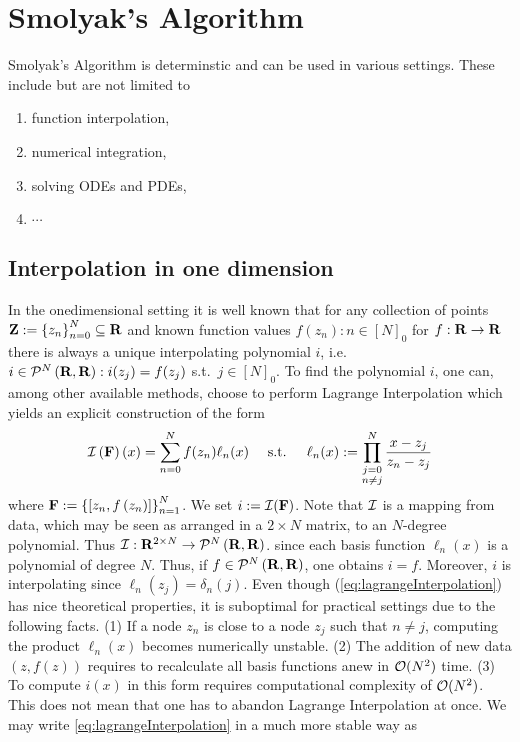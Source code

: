 \documentclass[12pt, oneside]{amsart}
\theoremstyle{definition}
\theoremstyle{remark}
\numberwithin{equation}{section}
\begin{document}
\section{Smolyak's Algorithm}


Smolyak's Algorithm is determinstic and can be used in various settings. These include but are not limited to
\begin{enumerate}
    \item function interpolation,
    \item numerical integration,
    \item solving ODEs and PDEs,
    \item \(\cdots\)
\end{enumerate}
\subsection*{Interpolation in one dimension}
In the onedimensional setting it is well known that for any collection of points \(\ZZ \defn \set{z_n}_{n=0}^N \subseteq \R\) and known function values \(f(z_n): n \in {[N]}_0\) for \(f: \R \to \R\) there is always a unique interpolating polynomial \(i\), i.e. \(i \in \pols[N]{\R, \R}: i(z_j) = f(z_j)\) s.t.\ \(j \in {[N]}_0\). To find the polynomial \(i\), one can, among other available methods, choose to perform Lagrange Interpolation which yields an explicit construction of the form
\begin{equation}\label{eq:lagrangeInterpolation}
    \mathcal{I}\left(\FF\right)(x) = \sum_{n=0}^N f(z_n) \ell_n(x)\quad \text{ s.t. }\quad \ell_n(x) \defn \prod_{\substack{j = 0\\n \neq j}}^N \frac{x-z_j}{z_n-z_j}
\end{equation}
where \(\FF \defn \set{\left[z_n, f\left(z_n\right)\right]}_{n=1}^{N}\). We set \(i \defn \cI(\FF)\). Note that \(\cI\) is a mapping from data, which may be seen as arranged in a \(2 \times N\) matrix, to an \(N\)-degree polynomial. Thus \(\cI: \R^{2 \times N} \to \pols[N]{\R,\R}\). since each basis function \(\ell_n(x)\) is a polynomial of degree \(N\). Thus, if \(f \in \pols[N]{\R, \R}\), one obtains \(i = f\). Moreover, \(i\) is interpolating since \(\ell_n(z_j) = \delta_{n}(j)\). Even though (\ref{eq:lagrangeInterpolation}) has nice theoretical properties, it is suboptimal for practical settings due to the following facts. (1) If a node \(z_n\) is close to a node \(z_j\) such that \(n \neq j\), computing the product \(\ell_n(x)\) becomes numerically unstable. (2) The addition of new data \(\left(z, f(z)\right)\) requires to recalculate all basis functions anew in \(\cO(N^2)\) time. (3) To compute \(i(x)\) in this form requires computational complexity of \(\cO(N^2)\). This does not mean that one has to abandon Lagrange Interpolation at once. We may write \cref{eq:lagrangeInterpolation} in a much more stable way as
\end{document}
